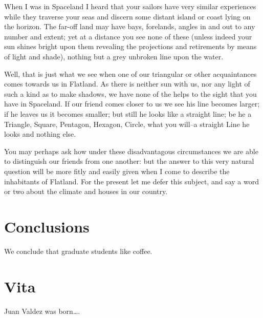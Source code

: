 \documentclass[edeposit,fullpage]{uiucthesis2009}
\begin{document}
When I was in Spaceland I heard that your sailors have very similar
experiences while they traverse your seas and discern some distant
island or coast lying on the horizon.  The far-off land may have bays,
forelands, angles in and out to any number and extent; yet at a
distance you see none of these (unless indeed your sun shines bright
upon them revealing the projections and retirements by means of light
and shade), nothing but a grey unbroken line upon the water.

Well, that is just what we see when one of our triangular or other
acquaintances comes towards us in Flatland.  As there is neither sun
with us, nor any light of such a kind as to make shadows, we have none
of the helps to the sight that you have in Spaceland.  If our friend
comes closer to us we see his line becomes larger; if he leaves us it
becomes smaller; but still he looks like a straight line; be he a
Triangle, Square, Pentagon, Hexagon, Circle, what you will--a straight
Line he looks and nothing else.

You may perhaps ask how under these disadvantagous circumstances we are
able to distinguish our friends from one another: but the answer to
this very natural question will be more fitly and easily given when I
come to describe the inhabitants of Flatland.  For the present let me
defer this subject, and say a word or two about the climate and houses
in our country.






\chapter{Conclusions}

We conclude that graduate students like coffee.

\appendix*



\backmatter



\chapter{Vita}

Juan Valdez was born\ldots.
\end{document}
